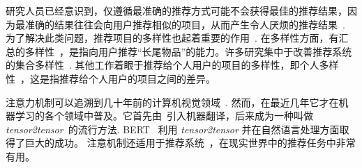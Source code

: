 
研究人员已经意识到，仅遵循最准确的推荐方式可能不会获得最佳的推荐结果，因为最准确的结果往往会向用户推荐相似的项目，从而产生令人厌烦的推荐结果~\cite{panniello2014comparing}. 为了解决此类问题，推荐项目的多样性也起着重要的作用~\cite{slaney2006measuring}. 在多样性方面，有汇总的多样性~\cite{adomavicius2011improving}，是指向用户推荐“长尾物品”的能力。许多研究集中于改善推荐系统的集合多样性~\cite{bag2019integrated,adomavicius2011improving,niemann2013new,qin2013promoting}. 其他工作着眼于推荐给个人用户的项目的多样性，即个人多样性~\cite{adomavicius2011improving,yu2019recommendation,kalaivanan2013recommendation,di2014analysis}，这是指推荐给个人用户的项目之间的差异。


注意力机制可以追溯到几十年前的计算机视觉领域~\cite{burt1988attention,sun2003object}. 然而，在最近几年它才在机器学习的各个领域中普及。它首先由~\cite{bahdanau2014neural}引入机器翻译，后来成为一种叫做 \textit{tensor2tensor}~\cite{vaswani2017attention}的流行方法. BERT~\cite{devlin2018bert} 利用 \textit{tensor2tensor} 并在自然语言处理方面取得了巨大的成功。
注意机制还适用于推荐系统~\cite{zhou2018atrank,cen2019representation}，在现实世界中的推荐任务中非常有用。


